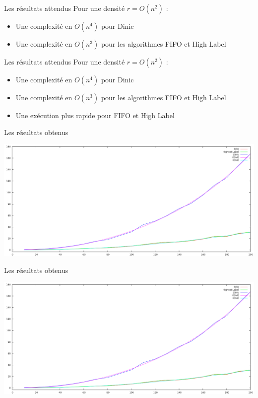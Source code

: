 \begin{frame}{Les résultats attendus}
	Pour une densité $r = O(n^2)$ : \begin{itemize}
		\item Une complexité en $O(n^4)$ pour Dinic
		\item Une complexité en $O(n^3)$ pour les algorithmes FIFO et High Label
	\end{itemize}
\end{frame}

\begin{frame}{Les résultats attendus}
	Pour une densité $r = O(n^2)$ : \begin{itemize}
		\item Une complexité en $O(n^4)$ pour Dinic
		\item Une complexité en $O(n^3)$ pour les algorithmes FIFO et High Label
		\item Une exécution plus rapide pour FIFO et High Label
	\end{itemize}
\end{frame}

\begin{frame}{Les résultats obtenus}
	\begin{center}
	\includegraphics{img/resultat.png}
	\end{center}
\end{frame}


\begin{frame}{Les résultats obtenus}
	\begin{minipage}[c]{0.50\linewidth}
		\includegraphics[scale=0.6]{img/resultat.png}
	\end{minipage}\hfill
	\begin{minipage}[c]{0.40\linewidth}
	\end{minipage}
\end{frame}


